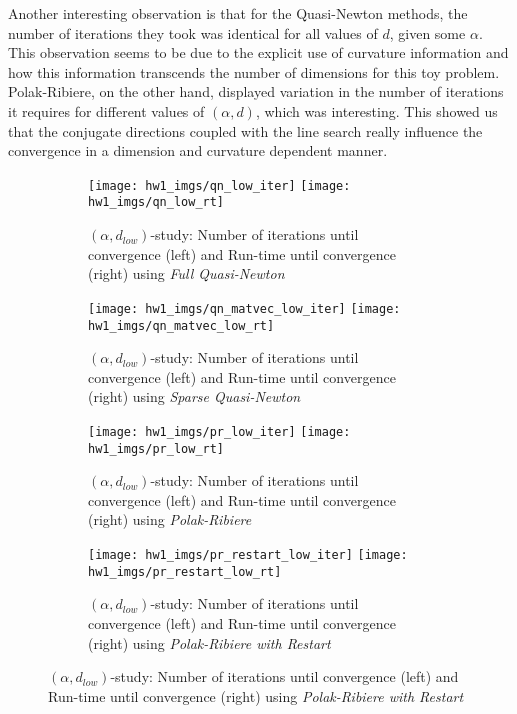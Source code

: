 Another interesting observation is that for the Quasi-Newton methods, the number of iterations they took was identical for all values of $d$, given some $\alpha$. This observation seems to be due to the explicit use of curvature information and how this information transcends the number of dimensions for this toy problem. Polak-Ribiere, on the other hand, displayed variation in the number of iterations it requires for different values of $(\alpha,d)$, which was interesting. This showed us that the conjugate directions coupled with the line search really influence the convergence in a dimension and curvature dependent manner.

\begin{figure}[h!]
    \begin{subfigure}{\textwidth}
      \texttt{[image: hw1\_imgs/qn\_low\_iter]}\hfill
      \texttt{[image: hw1\_imgs/qn\_low\_rt]}
      \caption{$(\alpha,d_{low})$-study: Number of iterations until convergence (left) and Run-time until convergence (right) using \textit{Full Quasi-Newton}}
      \label{fig:low_fqn}
    \end{subfigure}%
    \begin{subfigure}{\textwidth}
      \texttt{[image: hw1\_imgs/qn\_matvec\_low\_iter]}\hfill
      \texttt{[image: hw1\_imgs/qn\_matvec\_low\_rt]}
      \caption{$(\alpha,d_{low})$-study: Number of iterations until convergence (left) and Run-time until convergence (right) using \textit{Sparse Quasi-Newton}}
      \label{fig:low_sqn}
    \end{subfigure}%
    \begin{subfigure}{\textwidth}
      \texttt{[image: hw1\_imgs/pr\_low\_iter]}\hfill
      \texttt{[image: hw1\_imgs/pr\_low\_rt]}
      \caption{$(\alpha,d_{low})$-study: Number of iterations until convergence (left) and Run-time until convergence (right) using \textit{Polak-Ribiere}}
      \label{fig:low_pr}
    \end{subfigure}
    \begin{subfigure}{\textwidth}
      \texttt{[image: hw1\_imgs/pr\_restart\_low\_iter]}\hfill
      \texttt{[image: hw1\_imgs/pr\_restart\_low\_rt]}
      \caption{$(\alpha,d_{low})$-study: Number of iterations until convergence (left) and Run-time until convergence (right) using \textit{Polak-Ribiere with Restart}}
      \label{fig:low_prr}
    \end{subfigure}
\end{figure}


